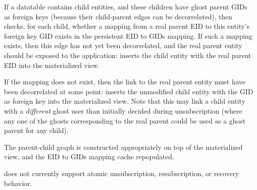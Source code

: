 If a datatable contains child entities, and these children have ghost parent GIDs as foreign
keys (because their child-parent edges can be decorrelated), then \sys{} checks, for each child, whether a mapping
from a real parent EID to this entity's foreign key GID exists in the persistent EID to GIDs
mapping. If such a mapping exists, then this edge has not yet been decorrelated, and the real parent
entity should be exposed to the application: \sys{} inserts the child entity with the real parent
EID into the materialized view.

If the mapping does not exist, then the link to the real parent entity must have been decorrelated at some point:
\sys{} inserts the unmodified child entity with the GID as foreign key into the materialized view.
Note that this may link a child entity with a \emph{different} ghost user than initially decided
during unsubscription (where any one of the ghosts corresponding to the real parent could be used as
a ghost parent for any child). 

The parent-child graph is constructed appropriately on top of the materialized view, and the EID to
GIDs mapping cache repopulated.

\sys{} does not currently support atomic unsubscription, resubscription, or recovery behavior.
